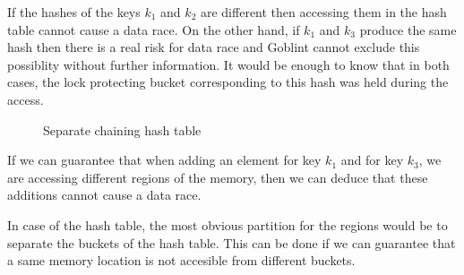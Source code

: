 \documentclass[..thesis.tex]{subfiles}
\begin{document}
If the hashes of the keys $k_1$ and $k_2$ are different then accessing them in the hash table cannot cause a data race.
On the other hand, if $k_1$ and $k_3$ produce the same hash then there is a real risk for data race and Goblint cannot exclude this possiblity without further information.
It would be enough to know that in both cases, the lock protecting bucket corresponding to this hash was held during the access.

\begin{figure}[H]
  \centering
  \caption{Separate chaining hash table} 
\end{figure}


If we can guarantee that when adding an element for key $k_1$ and for key $k_3$,
we are accessing different regions of the memory, then we can deduce that these additions cannot cause a data race.

In case of the hash table, the most obvious partition for the regions would be to separate the buckets of the hash table.
This can be done if we can guarantee that a same memory location is not accesible from different buckets.
\end{document}
